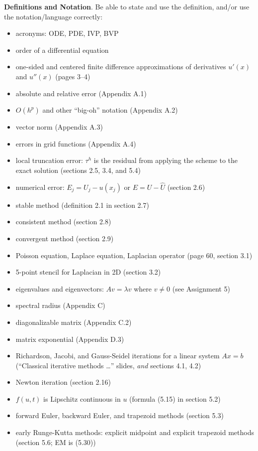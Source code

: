 \documentclass[12pt]{amsart}
\newcommand{\bigspacing}{\renewcommand{\baselinestretch}{1.15}\tiny\normalsize}
\begin{document}
\bigspacing
\noindent \textbf{Definitions and Notation}.  Be able to state and use the definition, and/or use the notation/language correctly:
\begin{itemize}
\item acronyms: ODE, PDE, IVP, BVP
\item order of a differential equation
\item one-sided and centered finite difference approximations of derivatives $u'(x)$ and $u''(x)$ (pages 3--4)
\item absolute and relative error (Appendix A.1)
\item $O(h^p)$ and other ``big-oh'' notation (Appendix A.2)
\item vector norm (Appendix A.3)
\item errors in grid functions (Appendix A.4)
\item local truncation error: $\tau^h$ is the residual from applying the scheme to the exact solution (sections 2.5, 3.4, and 5.4)
\item numerical error: $E_j = U_j - u(x_j)$ or $E = U - \hat U$ (section 2.6)
\item stable method (definition 2.1 in section 2.7)
\item consistent method (section 2.8)
\item convergent method (section 2.9)
\item Poisson equation, Laplace equation, Laplacian operator (page 60, section 3.1)
\item 5-point stencil for Laplacian in 2D (section 3.2)
\item eigenvalues and eigenvectors: $A v = \lambda v$ where $v\ne 0$ (see Assignment 5)
\item spectral radius (Appendix C)
\item diagonalizable matrix (Appendix C.2)
\item matrix exponential (Appendix D.3)
\item Richardson, Jacobi, and Gauss-Seidel iterations for a linear system $Ax=b$ (``Classical iterative methods \dots'' slides, \emph{and} sections 4.1, 4.2)
\item Newton iteration (section 2.16)
\item $f(u,t)$ is Lipschitz continuous in $u$ (formula (5.15) in section 5.2)
\item forward Euler, backward Euler, and trapezoid methods (section 5.3)
\item early Runge-Kutta methods: explicit midpoint and explicit trapezoid methods (section 5.6; EM is (5.30))
\end{itemize}
\end{document}
